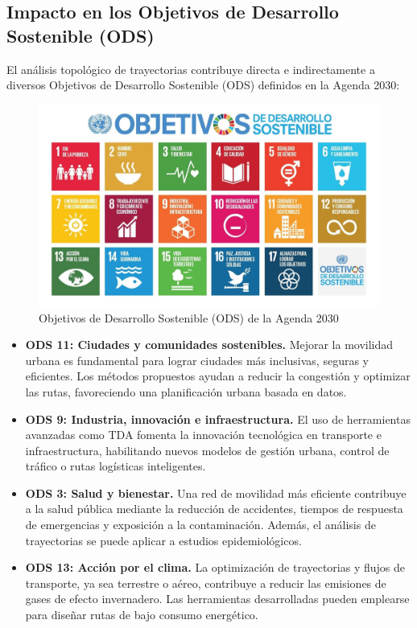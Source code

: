 \subsection{Impacto en los Objetivos de Desarrollo Sostenible (ODS)}

El análisis topológico de trayectorias contribuye directa e indirectamente a diversos Objetivos de Desarrollo Sostenible (ODS) definidos en la Agenda 2030:

\begin{figure}[h]
    \centering
    \includegraphics[scale=0.25]{images/agenda_2030.jpg}
    \caption{Objetivos de Desarrollo Sostenible (ODS) de la Agenda 2030 \cite{ODS}}
    \label{fig:ejemplo}
\end{figure}


\begin{itemize}
    \item \textbf{ODS 11: Ciudades y comunidades sostenibles.} Mejorar la movilidad urbana es fundamental para lograr ciudades más inclusivas, seguras y eficientes. Los métodos propuestos ayudan a reducir la congestión y optimizar las rutas, favoreciendo una planificación urbana basada en datos.

    \item \textbf{ODS 9: Industria, innovación e infraestructura.} El uso de herramientas avanzadas como TDA fomenta la innovación tecnológica en transporte e infraestructura, habilitando nuevos modelos de gestión urbana, control de tráfico o rutas logísticas inteligentes.
    \vspace{2cm}
    \item \textbf{ODS 3: Salud y bienestar.} Una red de movilidad más eficiente contribuye a la salud pública mediante la reducción de accidentes, tiempos de respuesta de emergencias y exposición a la contaminación. Además, el análisis de trayectorias se puede aplicar a estudios epidemiológicos.

    \item \textbf{ODS 13: Acción por el clima.} La optimización de trayectorias y flujos de transporte, ya sea terrestre o aéreo, contribuye a reducir las emisiones de gases de efecto invernadero. Las herramientas desarrolladas pueden emplearse para diseñar rutas de bajo consumo energético.
\end{itemize}

